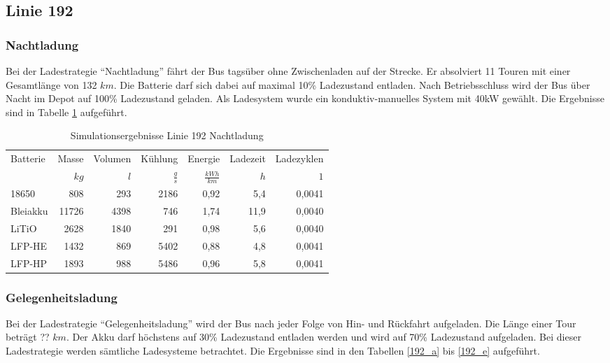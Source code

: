 \subsection{Linie 192}
\subsubsection{Nachtladung}
Bei der Ladestrategie "`Nachtladung"' fährt der Bus tagsüber ohne Zwischenladen auf der Strecke. Er absolviert 11 Touren mit einer Gesamtlänge von 132 $km$. Die Batterie darf sich dabei auf maximal 10\% Ladezustand entladen. Nach Betriebsschluss wird der Bus über Nacht im Depot auf 100\% Ladezustand geladen. Als Ladesystem wurde ein konduktiv-manuelles System mit 40kW gewählt. Die Ergebnisse sind in Tabelle \ref{192nacht} aufgeführt.

\begin{table}\centering
	\begin{tabularx}{\textwidth}{Xrrrrrr}
		\toprule
		Batterie & Masse & Volumen &       Kühlung &          Energie & Ladezeit & Ladezyklen \\
		         &  $kg$ &     $l$ & $\frac{g}{s}$ & $\frac{kWh}{km}$ &      $h$ &        $1$ \\ \midrule
		18650    &   808 &     293 &          2186 &             0,92 &      5,4 &     0,0041 \\
		Bleiakku & 11726 &    4398 &           746 &             1,74 &     11,9 &     0,0040 \\
		LiTiO    &  2628 &    1840 &           291 &             0,98 &      5,6 &     0,0040 \\
		LFP-HE   &  1432 &     869 &          5402 &             0,88 &      4,8 &     0,0041 \\
		LFP-HP   &  1893 &     988 &          5486 &             0,96 &      5,8 &     0,0041 \\ \bottomrule
	\end{tabularx}
	\caption{Simulationsergebnisse Linie 192 Nachtladung}
	\label{192nacht}
\end{table}
\subsubsection{Gelegenheitsladung}
Bei der Ladestrategie "`Gelegenheitsladung"' wird der Bus nach jeder Folge von Hin- und Rückfahrt aufgeladen. Die Länge einer Tour beträgt ??  $km$. Der Akku darf höchstens auf 30\% Ladezustand entladen werden und wird auf 70\% Ladezustand aufgeladen. Bei dieser Ladestrategie werden sämtliche Ladesysteme betrachtet. Die Ergebnisse sind in den Tabellen \ref{192_a} bis \ref{192_e} aufgeführt.

